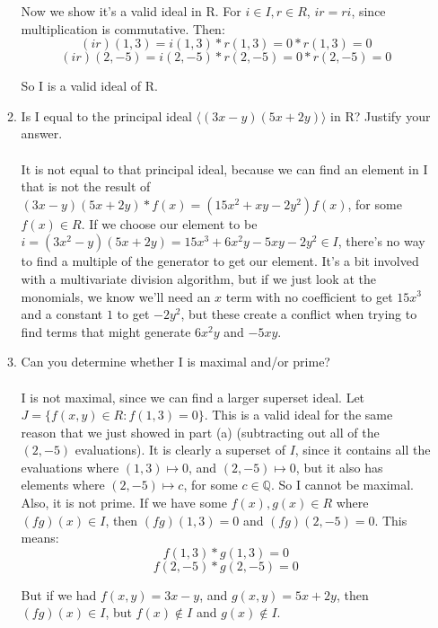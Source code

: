 \begin{enumerate}
\begin{enumerate}
          Now we show it's a valid ideal in R. For $i \in I, r \in R$, $ir = ri$, since multiplication is commutative. Then:
          $$(ir)(1,3) = i(1,3)*r(1,3) = 0*r(1,3) = 0$$
          $$(ir)(2,-5) = i(2,-5)*r(2,-5) = 0*r(2,-5) = 0$$
          
          So I is a valid ideal of R.\\
          
        \item Is I equal to the principal ideal $\langle (3x-y)(5x+2y) \rangle$ in R? Justify your answer.\\\\
          It is not equal to that principal ideal, because we can find an element in I that is not the result of $(3x-y)(5x+2y)*f(x) = (15x^2 +xy -2y^2)f(x)$, for some $f(x) \in R$. If we choose our element to be $i = (3x^2-y)(5x+2y) = 15x^3 + 6x^2y - 5xy - 2y^2 \in I$, there's no way to find a multiple of the generator to get our element. It's a bit involved with a multivariate division algorithm, but if we just look at the monomials, we know we'll need an $x$ term with no coefficient to get $15x^3$ and a constant $1$ to get $-2y^2$, but these create a conflict when trying to find terms that might generate $6x^2y$ and $-5xy$.\\

        \item Can you determine whether I is maximal and/or prime?\\\\

          I is not maximal, since we can find a larger superset ideal. Let $J = \{f(x,y) \in R : f(1,3) = 0 \}$. This is a valid ideal for the same reason that we just showed in part (a) (subtracting out all of the $(2,-5)$ evaluations). It is clearly a superset of $I$, since it contains all the evaluations where $(1,3) \mapsto 0$, and $(2,-5) \mapsto 0$, but it also has elements where $(2,-5) \mapsto c$, for some $c \in \mathds{Q}$. So I cannot be maximal.\\

          Also, it is not prime. If we have some $f(x), g(x) \in R$ where $(fg)(x) \in I$, then $(fg)(1,3) = 0$ and $(fg)(2,-5) = 0$. This means:
          $$f(1,3)*g(1,3) = 0$$ 
          $$f(2,-5)*g(2,-5) = 0$$

          But if we had $f(x,y) = 3x-y$, and $g(x,y) = 5x+2y$, then $(fg)(x) \in I$, but $f(x) \not\in I$ and $g(x) \not\in I$.
          
        \end{enumerate}
\end{enumerate}


